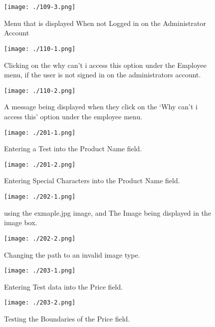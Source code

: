 \begin{figure}[H]
    \texttt{[image: ./109-3.png]}
    \caption{Menu that is displayed When not Logged in on the Administrator Account} \label{fig:109-3}
\end{figure}

\begin{figure}[H]
    \texttt{[image: ./110-1.png]}
    \caption{Clicking on the why can't i access this option under the Employee menu, if the user is not signed in on the administrators account.} \label{fig:110-1}
\end{figure}

\begin{figure}[H]
    \texttt{[image: ./110-2.png]}
    \caption{A message being displayed when they click on the `Why can't i access this' option under the employee menu.} \label{fig:110-2}
\end{figure}

\begin{figure}[H]
    \texttt{[image: ./201-1.png]}
    \caption{Entering a Test into the Product Name field.} \label{fig:201-1}
\end{figure}

\begin{figure}[H]
    \texttt{[image: ./201-2.png]}
    \caption{Entering Special Characters into the Product Name field.} \label{fig:201-2}
\end{figure}

\begin{figure}[H]
    \texttt{[image: ./202-1.png]}
    \caption{using the exmaple.jpg image, and The Image being displayed in the image box.} \label{fig:202-1}
\end{figure}

\begin{figure}[H]
    \texttt{[image: ./202-2.png]}
    \caption{Changing the path to an invalid image type.} \label{fig:202-2}
\end{figure}

\begin{figure}[H]
    \texttt{[image: ./203-1.png]}
    \caption{Entering Test data into the Price field.} \label{fig:203-1}
\end{figure}

\begin{figure}[H]
    \texttt{[image: ./203-2.png]}
    \caption{Testing the Boundaries of the Price field.} \label{fig:203-2}
\end{figure}

